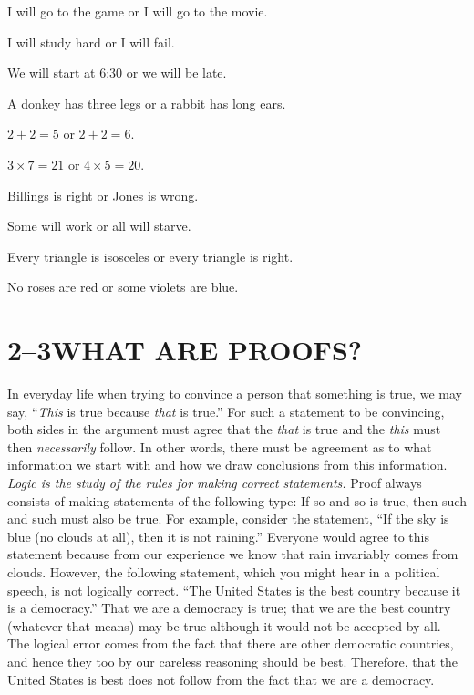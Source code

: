 \documentclass[11pt]{book}
\begin{document}
\begin{exercisecols}
\begin{exlist}
\item I will go to the game or I will go to the movie.
\item I will study hard or I will fail.
\item We will start at 6:30 or we will be late.
\item A donkey has three legs or a rabbit has long ears.
\item $2 + 2 = 5$ or $2 + 2 = 6$.
\item $3 \times 7 = 21$ or $4 \times 5 = 20$.
\item Billings is right or Jones is wrong.
\item[\stex 8.] Some will work or all will starve.
\item[\stex 9.] Every triangle is isosceles or every triangle is right.
\item[\stex 10.] No roses are red or some violets are blue.
\end{exlist}
\end{exercisecols}

\section*{2--3\quad WHAT ARE PROOFS?}

In everyday life when trying to convince a person that something is true, we may
say, ``\emph{This} is true because \emph{that} is true.'' For such a statement to
be convincing, both sides in the argument must agree that the \emph{that} is true
and the \emph{this} must then \emph{necessarily} follow. In other words, there
must be agreement as to what information we start with and how we draw
conclusions from this information. \emph{Logic is the study of the rules for
making correct statements.} Proof always consists of making statements of the
following type: If so and so is true, then such and such must also be true. For
example, consider the statement, ``If the sky is blue (no clouds at all), then it
is not raining.'' Everyone would agree to this statement because from our
experience we know that rain invariably comes from clouds. However, the following
statement, which you might hear in a political speech, is not logically correct.
``The United States is the best country because it is a democracy.'' That we are a
democracy is true; that we are the best country (whatever that means) may be true
although it would not be accepted by all. The logical error comes from the fact
that there are other democratic countries, and hence they too by our careless
reasoning should be best. Therefore, that the United States is best does not
follow from the fact that we are a democracy.
\end{document}
